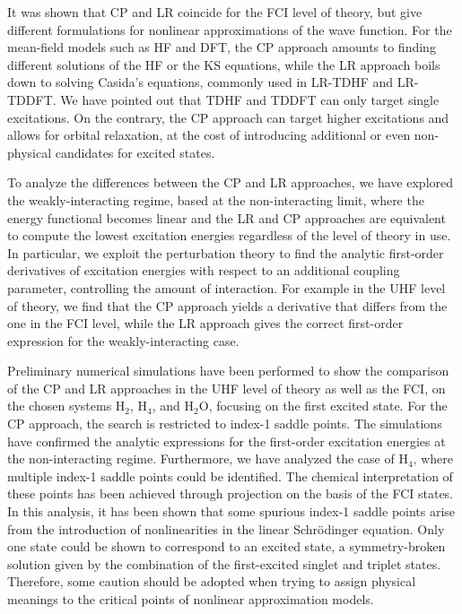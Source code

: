 \documentclass[11pt]{article}
\begin{document}
It was shown that CP and LR coincide for the FCI level of theory, but give different formulations for nonlinear approximations of the wave function. 
For the mean-field models such as HF and DFT, the CP approach amounts to finding different solutions of the HF or the KS equations, while the LR approach boils down to solving Casida's equations, commonly used in LR-TDHF and LR-TDDFT.
We have pointed out that TDHF and TDDFT can only target single excitations. On the contrary, the CP approach can target higher excitations and allows for orbital relaxation, at the cost of introducing additional or even non-physical candidates for excited states.

\par To analyze the differences between the CP and LR approaches, we have explored the weakly-interacting regime, based at the non-interacting limit, where the energy functional becomes linear and the LR and CP approaches are equivalent to compute the lowest excitation energies regardless of the level of theory in use. In particular, we exploit the perturbation theory to find the analytic first-order derivatives of excitation energies with respect to an additional coupling parameter, controlling the amount of interaction. For example in the UHF level of theory, we find that the CP approach yields a derivative that differs from the one in the FCI level, while the LR approach gives the correct first-order expression for the weakly-interacting case. 

Preliminary numerical simulations have been performed to show the comparison of the CP and LR approaches in the UHF level of theory as well as the FCI, on the chosen systems H$_2$, H$_4$, and H$_2$O, focusing on the first excited state. For the CP approach, the search is restricted to index-1 saddle points. The simulations have confirmed the analytic expressions for the first-order excitation energies at the non-interacting regime. Furthermore, we have analyzed the case of H$_4$, where multiple index-1 saddle points could be identified. The chemical interpretation of these points has been achieved through projection on the basis of the FCI states. In this analysis, it has been shown that some spurious index-1 saddle points arise from the introduction of nonlinearities in the linear Schrödinger equation. Only one state could be shown to correspond to an excited state, a symmetry-broken solution given by the combination of the first-excited singlet and triplet states. Therefore, some caution should be adopted when trying to assign physical meanings to the critical points of nonlinear approximation models.
\end{document}
